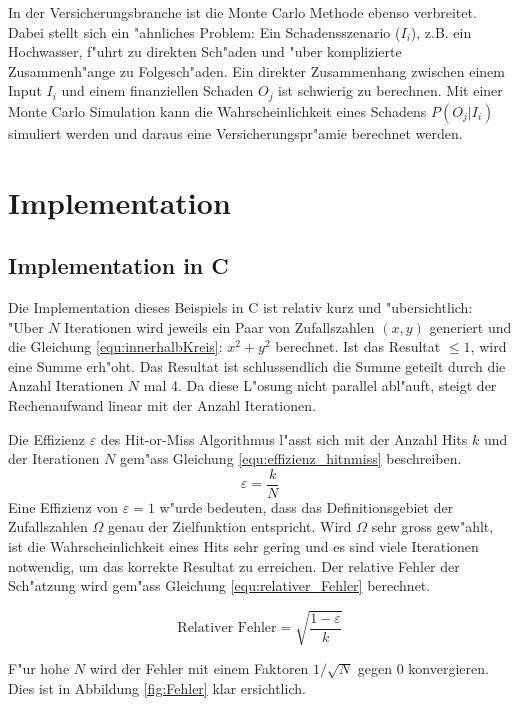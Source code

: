 \begin{refsection}
In der Versicherungsbranche ist die Monte Carlo Methode ebenso
verbreitet. Dabei stellt sich ein "ahnliches Problem: Ein Schadensszenario
($I_i$), z.B. ein Hochwasser, f"uhrt zu direkten Sch"aden und "uber
komplizierte Zusammenh"ange zu Folgesch"aden. Ein direkter Zusammenhang
zwischen einem Input $I_i$ und einem finanziellen Schaden $O_j$ ist
schwierig zu berechnen. Mit einer Monte Carlo Simulation kann die
Wahrscheinlichkeit eines Schadens $P(O_j | I_i)$ simuliert werden und
daraus eine Versicherungspr"amie berechnet werden.



\section{Implementation}
\subsection{Implementation in C}
Die Implementation dieses Beispiels in C ist relativ kurz und
"ubersichtlich: "Uber $N$ Iterationen wird jeweils ein Paar von
Zufallszahlen $(x,y)$ generiert und die Gleichung
\ref{equ:innerhalbKreis}: $x^2 + y^2$ berechnet. Ist das Resultat $\leq1$,
wird eine Summe erh"oht. Das Resultat ist schlussendlich die Summe geteilt
durch die Anzahl Iterationen $N$ mal 4. Da diese L"osung nicht parallel
abl"auft, steigt der Rechenaufwand linear mit der Anzahl Iterationen.

Die Effizienz $\varepsilon$ des Hit-or-Miss Algorithmus l"asst sich
mit der Anzahl Hits $k$ und der Iterationen $N$ gem"ass Gleichung
\ref{equ:effizienz_hitnmiss} beschreiben.
\begin{equation}
	\varepsilon = \frac{k}{N}
	\label{equ:effizienz_hitnmiss}
\end{equation} 
Eine Effizienz von $\varepsilon=1$ w"urde bedeuten, dass das
Definitionsgebiet der Zufallszahlen $\Omega$ genau der Zielfunktion
entspricht. Wird $\Omega$ sehr gross gew"ahlt, ist die Wahrscheinlichkeit
eines Hits sehr gering und es sind viele Iterationen notwendig, um das
korrekte Resultat zu erreichen. Der relative Fehler der Sch"atzung wird
gem"ass Gleichung \ref{equ:relativer_Fehler} berechnet.

\begin{equation}
	\text{Relativer Fehler} = \sqrt{\frac{1-\varepsilon}{k}} 
	\label{equ:relativer_Fehler}
\end{equation}

F"ur hohe $N$ wird der Fehler mit einem Faktoren $1 / \sqrt{N}$ gegen $0$
konvergieren. Dies ist in Abbildung \ref{fig:Fehler} klar ersichtlich.


\end{refsection}

